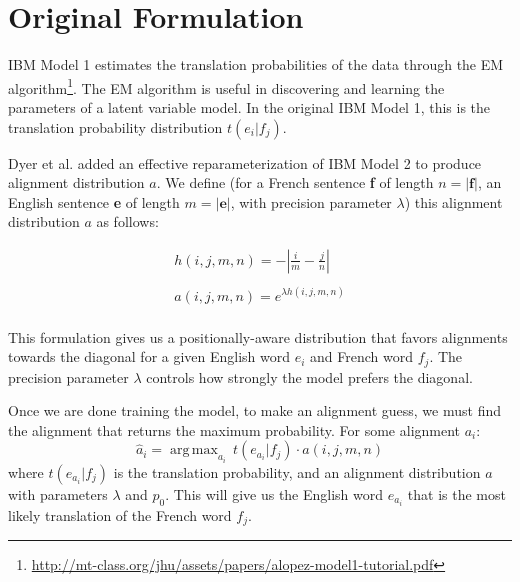 \documentclass[twoside,twocolumn]{article}
\DeclareMathOperator*{\argmax}{arg\,max}
\begin{document}

\section{Original Formulation}


IBM Model 1 estimates the translation probabilities of the data through the EM
algorithm\footnote{\url{http://mt-class.org/jhu/assets/papers/alopez-model1-tutorial.pdf}}.
The EM algorithm is useful in discovering and learning the parameters of a
latent variable model. In the original IBM Model 1, this is the translation
probability distribution $t(e_i|f_j)$.

Dyer et al. \cite{dyer2013simple} added an effective reparameterization
of IBM Model 2 to produce alignment distribution $a$. We define (for a French
sentence \textbf{f} of length $n = |\textbf{f}|$, an English sentence \textbf{e}
of length $m=|\textbf{e}|$, with precision parameter $\lambda$) this alignment
distribution $a$ as follows:

\begin{equation}
\begin{split}
h(i,j,m,n) = - \left| \frac{i}{m} - \frac{j}{n}\right| \\
\\
a(i,j,m,n) =e^{  \lambda h(i,j,m,n)} \\
\end{split}
\end{equation}

This formulation gives us a positionally-aware distribution that favors alignments
towards the diagonal for a given English word $e_i$ and French word $f_j$. The
precision parameter $\lambda$ controls how strongly the model prefers the
diagonal.

Once we are done training the model, to make an alignment guess, we must find
the alignment that returns the maximum probability. For some alignment $a_i$:
\begin{equation}
\hat{a}_i = \argmax_{a_i} \, t(e_{a_i}|f_j) \cdot a(i, j, m, n)
\end{equation}
where $t(e_{a_i}|f_j)$ is the translation probability, and an alignment
distribution $a$ with parameters $\lambda$ and $p_0$. This will give us the
English word $e_{a_i}$ that is the most likely translation of the French word
$f_j$.
\end{document}
